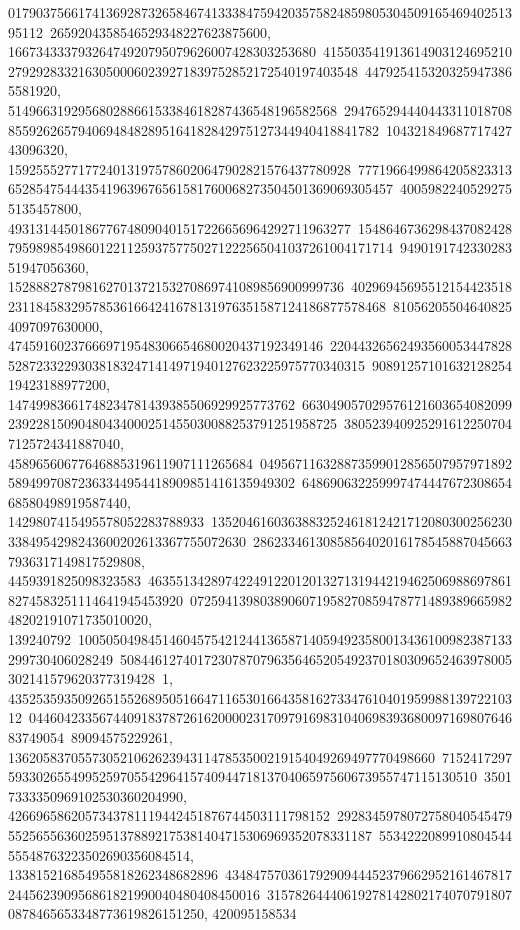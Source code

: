 {{{01790375661741369287326584674133384759420357582485980530450916546940251395112\
2659204358546529348227623875600, 16673433379326474920795079626007428303253680\
41550354191361490312469521027929283321630500060239271839752852172540197403548\
4479254153203259473865581920, 51496631929568028866153384618287436548196582568\
29476529444044331101870885592626579406948482895164182842975127344940418841782\
10432184968771742743096320, 1592555277177240131975786020647902821576437780928\
77719664998642058233136528547544435419639676561581760068273504501369069305457\
40059822405292755135457800, 4931314450186776748090401517226656964292711963277\
15486467362984370824287959898549860122112593757750271222565041037261004171714\
949019174233028351947056360, 152888278798162701372153270869741089856900999736\
40296945695512154423518231184583295785361664241678131976351587124186877578468\
810562055046408254097097630000, 474591602376669719548306654680020437192349146\
22044326562493560053447828528723322930381832471414971940127623225975770340315\
9089125710163212825419423188977200, 14749983661748234781439385506929925773762\
66304905702957612160365408209923922815090480434000251455030088253791251958725\
3805239409252916122507047125724341887040, 45896560677646885319611907111265684\
04956711632887359901285650795797189258949970872363344954418909851416135949302\
64869063225999747444767230865468580498919587440, 1429807415495578052283788933\
13520461603638832524618124217120803002562303384954298243600202613367755072630\
28623346130858564020161785458870456637936317149817529808, 4459391825098323583\
46355134289742249122012013271319442194625069886978618274583251114641945453920\
072594139803890607195827085947877148938966598248202191071735010020, 139240792\
10050504984514604575421244136587140594923580013436100982387133299730406028249\
50844612740172307870796356465205492370180309652463978005302141579620377319428\
1, 43525359350926515526895051664711653016643581627334761040195998813972210312\
04460423356744091837872616200002317097916983104069839368009716980764683749054\
89094575229261, 1362058370557305210626239431147853500219154049269497770498660\
71524172975933026554995259705542964157409447181370406597560673955747115130510\
35017333350969102530360204990, 4266965862057343781119442451876744503111798152\
29283459780727580405454795525655636025951378892175381404715306969352078331187\
553422208991080454455548763223502690356084514, 133815216854955818262348682896\
43484757036179290944452379662952161467817244562390956861821990040480408450016\
315782644406192781428021740707918070878465653348773619826151250, 420095158534\
}}}
